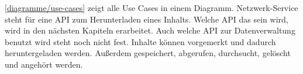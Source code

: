 \autoref{diagramme/use-cases} zeigt alle Use Cases in einem Diagramm. Netzwerk-Service steht für eine \ac{API} zum Herunterladen eines Inhalts. Welche \ac{API} das sein wird, wird in den nächsten Kapiteln erarbeitet. Auch welche \ac{API} zur Datenverwaltung benutzt wird steht noch nicht fest. Inhalte können vorgemerkt und dadurch heruntergeladen werden. Außerdem gespeichert, abgerufen, durchsucht, gelöscht und angehört werden.

